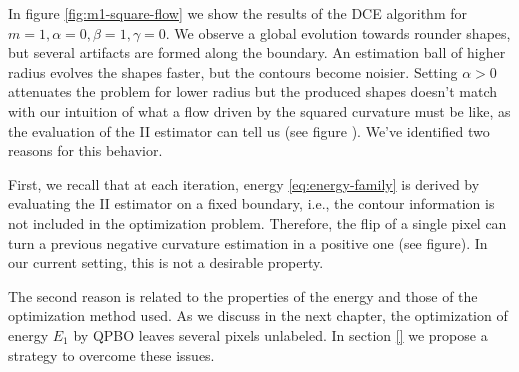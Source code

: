 In figure \ref{fig:m1-square-flow} we show the results of the DCE algorithm for $m=1,\alpha=0, \beta=1, \gamma=0$. We observe a global evolution towards rounder shapes, but several artifacts are formed along the boundary. An estimation ball of higher radius evolves the shapes faster, but the contours become noisier. Setting $\alpha >0$ attenuates the problem for lower radius but the produced shapes doesn't match with our intuition of what a flow driven by the squared curvature must be like, as the evaluation of the II estimator can tell us (see figure ). We've identified two reasons for this behavior.

First, we recall that at each iteration, energy \eqref{eq:energy-family} is derived by evaluating the II estimator on a fixed boundary, i.e., the contour information is not included in the optimization problem. Therefore, the flip of a single pixel can turn a previous negative curvature estimation in a positive one (see figure). In our current setting, this is not a desirable property. 

The second reason is related to the properties of the energy and those of the optimization method used. As we discuss in the next chapter, the optimization of energy $E_1$ by QPBO leaves several pixels unlabeled. In section \ref{} we propose a strategy to overcome these issues.



